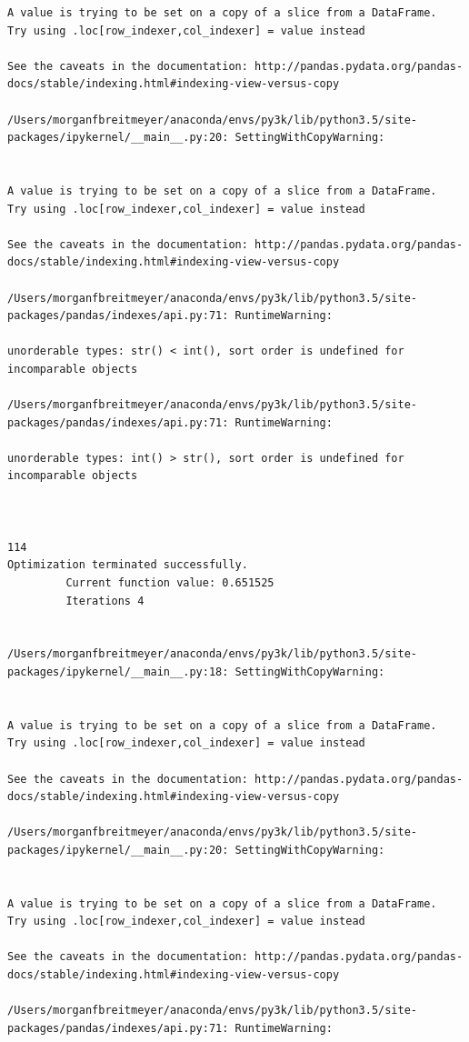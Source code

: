 \begin{lstlisting}
A value is trying to be set on a copy of a slice from a DataFrame.
Try using .loc[row_indexer,col_indexer] = value instead

See the caveats in the documentation: http://pandas.pydata.org/pandas-docs/stable/indexing.html#indexing-view-versus-copy

/Users/morganfbreitmeyer/anaconda/envs/py3k/lib/python3.5/site-packages/ipykernel/__main__.py:20: SettingWithCopyWarning:


A value is trying to be set on a copy of a slice from a DataFrame.
Try using .loc[row_indexer,col_indexer] = value instead

See the caveats in the documentation: http://pandas.pydata.org/pandas-docs/stable/indexing.html#indexing-view-versus-copy

/Users/morganfbreitmeyer/anaconda/envs/py3k/lib/python3.5/site-packages/pandas/indexes/api.py:71: RuntimeWarning:

unorderable types: str() < int(), sort order is undefined for incomparable objects

/Users/morganfbreitmeyer/anaconda/envs/py3k/lib/python3.5/site-packages/pandas/indexes/api.py:71: RuntimeWarning:

unorderable types: int() > str(), sort order is undefined for incomparable objects



114
Optimization terminated successfully.
         Current function value: 0.651525
         Iterations 4


/Users/morganfbreitmeyer/anaconda/envs/py3k/lib/python3.5/site-packages/ipykernel/__main__.py:18: SettingWithCopyWarning:


A value is trying to be set on a copy of a slice from a DataFrame.
Try using .loc[row_indexer,col_indexer] = value instead

See the caveats in the documentation: http://pandas.pydata.org/pandas-docs/stable/indexing.html#indexing-view-versus-copy

/Users/morganfbreitmeyer/anaconda/envs/py3k/lib/python3.5/site-packages/ipykernel/__main__.py:20: SettingWithCopyWarning:


A value is trying to be set on a copy of a slice from a DataFrame.
Try using .loc[row_indexer,col_indexer] = value instead

See the caveats in the documentation: http://pandas.pydata.org/pandas-docs/stable/indexing.html#indexing-view-versus-copy

/Users/morganfbreitmeyer/anaconda/envs/py3k/lib/python3.5/site-packages/pandas/indexes/api.py:71: RuntimeWarning:


\end{lstlisting}
